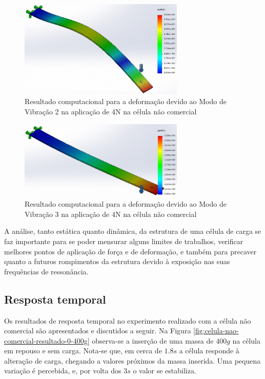\documentclass[a4paper]{instrumentacao}
\begin{document}
\begin{figure}[H]
\center
\includegraphics[width=0.7\textwidth]{CelulaNaoComercial_solid_modo2.jpg}
\caption{Resultado computacional para a deformação devido ao Modo de Vibração 2 na aplicação de 4N na célula não comercial}
\label{fig:celula-nao-comercial-computacional-modo2}
\end{figure}

\begin{figure}[H]
\center
\includegraphics[width=0.7\textwidth]{CelulaNaoComercial_solid_modo3.jpg}
\caption{Resultado computacional para a deformação devido ao Modo de Vibração 3 na aplicação de 4N na célula não comercial}
\label{fig:celula-nao-comercial-computacional-modo3}
\end{figure}

A análise, tanto estática quanto dinâmica, da estrutura de uma célula de carga se faz importante para se poder mensurar alguns limites de trabalhos, verificar melhores pontos de aplicação de força e de deformação, e também para precaver quanto a futuros rompimentos da estrutura devido à  exposição nas suas frequências de ressonância.

\subsection{Resposta temporal}

Os resultados de resposta temporal no experimento realizado com a célula não comercial são apresentados e discutidos a seguir. Na Figura \ref{fig:celula-nao-comercial-resultado-0-400g} observa-se a inserção de uma massa de $400g$ na célula em repouso e sem carga. Nota-se que, em cerca de $1.8s$ a célula responde à alteração de carga, chegando a valores próximos da massa inserida. Uma pequena variação é percebida, e, por volta dos $3s$ o valor se estabiliza.
\end{document}
